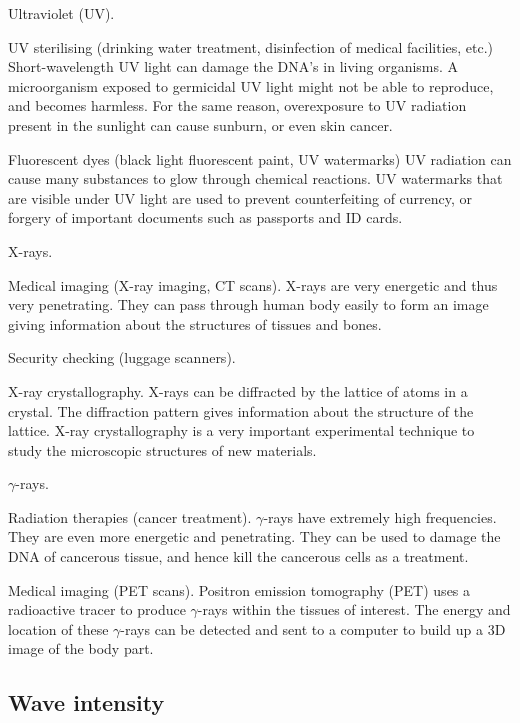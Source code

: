\documentclass[a4paper,12pt]{book}
\newcommand{\xskip}{\hspace{1em}}
\begin{document}
\begin{compactitem}
	\item[--] Ultraviolet (UV).
	
	\xskip UV sterilising (drinking water treatment, disinfection of medical facilities, etc.) Short-wavelength UV light can damage the DNA's in living organisms. A microorganism exposed to germicidal UV light might not be able to reproduce, and becomes harmless. For the same reason, overexposure to UV radiation present in the sunlight can cause sunburn, or even skin cancer.
		
	\xskip Fluorescent dyes (black light fluorescent paint, UV watermarks) UV radiation can cause many substances to glow through chemical reactions. UV watermarks that are visible under UV light are used to prevent counterfeiting of currency, or forgery of important documents such as passports and ID cards.
	
	\item[--] X-rays.
	
	\xskip Medical imaging (X-ray imaging, CT scans). X-rays are very energetic and thus very penetrating. They can pass through human body easily to form an image giving information about the structures of tissues and bones.
	
	\xskip Security checking (luggage scanners).
	
	\xskip X-ray crystallography. X-rays can be diffracted by the lattice of atoms in a crystal. The diffraction pattern gives information about the structure of the lattice. X-ray crystallography is a very important experimental technique to study the microscopic structures of new materials.
	
	\item[--] $\gamma$-rays.
	
	\xskip Radiation therapies (cancer treatment). $\gamma$-rays have extremely high frequencies. They are even more energetic and penetrating. They can be used to damage the DNA of cancerous tissue, and hence kill the cancerous cells as a treatment.
	
	\xskip Medical imaging (PET scans). Positron emission tomography (PET) uses a radioactive tracer to produce $\gamma$-rays within the tissues of interest. The energy and location of these $\gamma$-rays can be detected and sent to a computer to build up a 3D image of the body part.
\end{compactitem}
\newpage

	

\subsection{Wave intensity}
\end{document}
